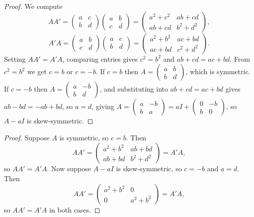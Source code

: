 \begin{proof}
    We compute
    \[
    AA' = \begin{pmatrix} a & c \\ b & d \end{pmatrix}\begin{pmatrix} a & b \\ c & d \end{pmatrix} = \begin{pmatrix} a^2+c^2 & ab+cd \\ ab+cd & b^2+d^2 \end{pmatrix},
    \]
    \[
    A'A = \begin{pmatrix} a & b \\ c & d \end{pmatrix}\begin{pmatrix} a & c \\ b & d \end{pmatrix} = \begin{pmatrix} a^2+b^2 & ac+bd \\ ac+bd & c^2+d^2 \end{pmatrix}.
    \]
    Setting $AA' = A'A$, comparing entries gives $c^2 = b^2$ and $ab + cd = ac + bd$. From $c^2 = b^2$ we get $c = b$ or $c = -b$. If $c = b$ then $A = \begin{pmatrix} a & b \\ b & d \end{pmatrix}$, which is symmetric. If $c = -b$ then $A = \begin{pmatrix} a & -b \\ b & d \end{pmatrix}$, and substituting into $ab + cd = ac + bd$ gives $ab - bd = -ab + bd$, so $a = d$, giving $A = \begin{pmatrix} a & -b \\ b & a \end{pmatrix} = aI + \begin{pmatrix} 0 & -b \\ b & 0 \end{pmatrix}$, so $A - aI$ is skew-symmetric.
\end{proof}

\begin{proof}
    Suppose $A$ is symmetric, so $c = b$. Then
    \[
    AA' = \begin{pmatrix} a^2+b^2 & ab+bd \\ ab+bd & b^2+d^2 \end{pmatrix} = A'A,
    \]
    so $AA' = A'A$. Now suppose $A - aI$ is skew-symmetric, so $c = -b$ and $a = d$. Then
    \[
    AA' = \begin{pmatrix} a^2+b^2 & 0 \\ 0 & a^2+b^2 \end{pmatrix} = A'A,
    \]
    so $AA' = A'A$ in both cases.
\end{proof}

